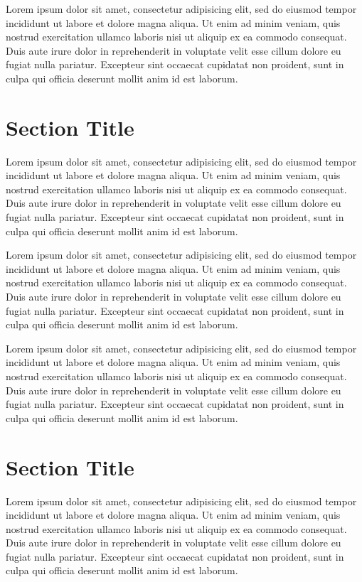 Lorem ipsum dolor sit amet, consectetur adipisicing elit, sed do eiusmod tempor incididunt ut labore et dolore magna aliqua. Ut enim ad minim veniam, quis nostrud exercitation ullamco laboris nisi ut aliquip ex ea commodo consequat. Duis aute irure dolor in reprehenderit in voluptate velit esse cillum dolore eu fugiat nulla pariatur. Excepteur sint occaecat cupidatat non proident, sunt in culpa qui officia deserunt mollit anim id est laborum.

\section{Section Title}
Lorem ipsum dolor sit amet, consectetur adipisicing elit, sed do eiusmod tempor incididunt ut labore et dolore magna aliqua. Ut enim ad minim veniam, quis nostrud exercitation ullamco laboris nisi ut aliquip ex ea commodo consequat. Duis aute irure dolor in reprehenderit in voluptate velit esse cillum dolore eu fugiat nulla pariatur. Excepteur sint occaecat cupidatat non proident, sunt in culpa qui officia deserunt mollit anim id est laborum.

Lorem ipsum dolor sit amet, consectetur adipisicing elit, sed do eiusmod tempor incididunt ut labore et dolore magna aliqua. Ut enim ad minim veniam, quis nostrud exercitation ullamco laboris nisi ut aliquip ex ea commodo consequat. Duis aute irure dolor in reprehenderit in voluptate velit esse cillum dolore eu fugiat nulla pariatur. Excepteur sint occaecat cupidatat non proident, sunt in culpa qui officia deserunt mollit anim id est laborum.

Lorem ipsum dolor sit amet, consectetur adipisicing elit, sed do eiusmod tempor incididunt ut labore et dolore magna aliqua. Ut enim ad minim veniam, quis nostrud exercitation ullamco laboris nisi ut aliquip ex ea commodo consequat. Duis aute irure dolor in reprehenderit in voluptate velit esse cillum dolore eu fugiat nulla pariatur. Excepteur sint occaecat cupidatat non proident, sunt in culpa qui officia deserunt mollit anim id est laborum.

\section{Section Title}
Lorem ipsum dolor sit amet, consectetur adipisicing elit, sed do eiusmod tempor incididunt ut labore et dolore magna aliqua. Ut enim ad minim veniam, quis nostrud exercitation ullamco laboris nisi ut aliquip ex ea commodo consequat. Duis aute irure dolor in reprehenderit in voluptate velit esse cillum dolore eu fugiat nulla pariatur. Excepteur sint occaecat cupidatat non proident, sunt in culpa qui officia deserunt mollit anim id est laborum.

